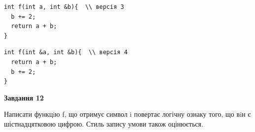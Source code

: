 \documentclass[12pt, ukrainian]{article}
\begin{document}
{\begin {large}
\begin{minipage}[t]{11.0cm}
\vspace{-8mm}\begin{verbatim}
int f(int a, int &b){  \\ версія 3
  b += 2;
  return a + b;
}
\end{verbatim}

\vspace{-8mm}\begin{verbatim}
int f(int &a, int &b){  \\ версія 4
  return a + b;
  b += 2;
}
\end{verbatim}



\begin{center}
\textbf{Завдання 12}
\end{center}

Написати функцiю f, що отримує символ i повертає логічну ознаку того, що вiн є шістнадцятковою цифрою. Стиль запису умови також оцінюється.\par

\end{minipage}

\end {large}}
\newpage
\end{document}
